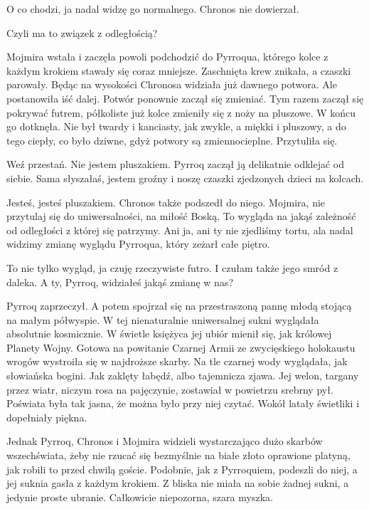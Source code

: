 \ds{} O co chodzi, ja nadal widzę go normalnego. \dm{} Chronos nie dowierzał. \de{}

\ds{} Czyli ma to związek z odległością? \dm{}

Mojmira wstała i zaczęła powoli podchodzić do Pyrroqua, którego kolce z każdym krokiem stawały się coraz mniejsze. Zaschnięta krew znikała, a czaszki parowały. 
Będąc na wysokości Chronosa widziała już dawnego potwora.
Ale postanowiła iść dalej. Potwór ponownie zaczął się zmieniać.
Tym razem zaczął się pokrywać futrem, półkoliste już kolce zmieniły się z noży na pluszowe.
W końcu go dotknęła.
Nie był twardy i kanciasty, jak zwykle, a miękki i pluszowy, a do tego ciepły, co było dziwne, gdyż potwory są zmiennocieplne.
Przytuliła się.

\ds{} Weź przestań. Nie jestem pluszakiem. \dm{} Pyrroq zaczął ją delikatnie odklejać od siebie. \dm{}
Sama słyszałaś, jestem groźny i noszę czaszki zjedzonych dzieci na kolcach. \de{}

\ds{} Jesteś, jesteś pluszakiem. \dm{} Chronos także podszedł do niego. \dm{} Mojmira, nie przytulaj się do uniwersalności, na miłość Boską.
To wygląda na jakąś zależność od odległości z której się patrzymy. Ani ja, ani ty nie zjedliśmy tortu, ala nadal widzimy zmianę wyglądu Pyrroqua, który zeżarł całe piętro. \de{}

\ds{} To nie tylko wygląd, ja czuję rzeczywiste futro. I czułam także jego smród z daleka. A ty, Pyrroq, widziałeś jakąś zmianę w nas? \de{}

Pyrroq zaprzeczył. A potem spojrzał się na przestraszoną pannę młodą stojącą na małym półwyspie.
W tej nienaturalnie uniwersalnej sukni wyglądała absolutnie kosmicznie.
W świetle księżyca jej ubiór mienił się, jak królowej Planety Wojny.
Gotowa na powitanie Czarnej Armii ze zwycięskiego holokaustu wrogów wystroiła się w najdroższe skarby.
Na tle czarnej wody wyglądała, jak słowiańska bogini. Jak zaklęty łabędź, albo tajemnicza zjawa.
Jej welon, targany przez wiatr, niczym rosa na pajęczynie, zostawiał w powietrzu srebrny pył.
Poświata była tak jasna, że można było przy niej czytać.
Wokół latały świetliki i dopełniały piękna.

Jednak Pyrroq, Chronos i Mojmira widzieli wystarczająco dużo skarbów wszechświata, żeby nie rzucać się bezmyślnie na białe złoto oprawione platyną, 
jak robili to przed chwilą goście.
Podobnie, jak z Pyrroquiem, podeszli do niej, a jej suknia gasła z każdym krokiem.
Z bliska nie miała na sobie żadnej sukni, a jedynie proste ubranie. Całkowicie niepozorna, szara myszka.

